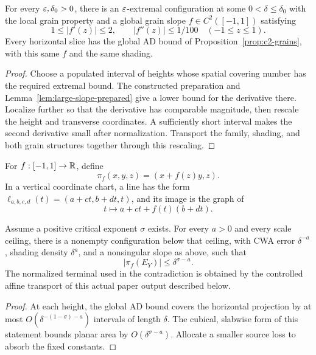 \begin{proposition}
\label{prop:large-slope}
\leanok
{}
For every $\varepsilon,\delta_0>0$, there is an $\varepsilon$-extremal
configuration at some $0<\delta\leq\delta_0$ with the local grain
property and a global grain slope $f\in C^2([-1,1])$ satisfying
\[
       1\leq|f'(z)|\leq2,\qquad |f''(z)|\leq1/100
       \quad(-1\leq z\leq1).
\]
Every horizontal slice has the global AD bound of
Proposition~\ref{prop:c2-grains}, with this same $f$ and the same
shading.
\end{proposition}
\begin{proof}
\leanok
Choose a populated interval of heights whose spatial covering number
has the required extremal bound. The constructed preparation and
Lemma~\ref{lem:large-slope-prepared} give a lower
bound for the derivative there. Localize further so that the derivative
has comparable magnitude, then rescale the height and transverse
coordinates. A sufficiently short interval makes the second derivative
small after normalization. Transport the family, shading, and both
grain structures together through this rescaling.
\end{proof}

\begin{definition}
\label{def:twisted-projection}
\leanok
For $f:[-1,1]\to\mathbb{R}$, define
\[
 \pi_f(x,y,z)=(x+f(z)y,z).
\]
In a vertical coordinate chart, a line has the form
$\ell_{a,b,c,d}(t)=(a+ct,b+dt,t)$, and its image is the graph of
\[
                   t\longmapsto a+ct+f(t)(b+dt).
\]
\end{definition}

\begin{lemma}
\label{lem:small-twisted-projection}
\leanok
{}
Assume a positive critical exponent $\sigma$ exists. For every
$a>0$ and every scale ceiling, there is a nonempty configuration
below that ceiling, with CWA error $\delta^{-a}$, shading density
$\delta^a$, and a nonsingular slope as above, such that
\[
                        |\pi_f(E_Y)|\leq\delta^{\sigma-a}.
\]
The normalized terminal used in the contradiction is obtained by the
controlled affine transport of this actual paper output described below.
\end{lemma}
\begin{proof}
\leanok
At each height, the global AD bound covers the horizontal projection
by at most $O(\delta^{-(1-\sigma)-a})$ intervals of length $\delta$.
The cubical, slabwise form of this statement bounds planar area by
$O(\delta^{\sigma-a})$. Allocate a smaller source loss to absorb
the fixed constants.
\end{proof}

